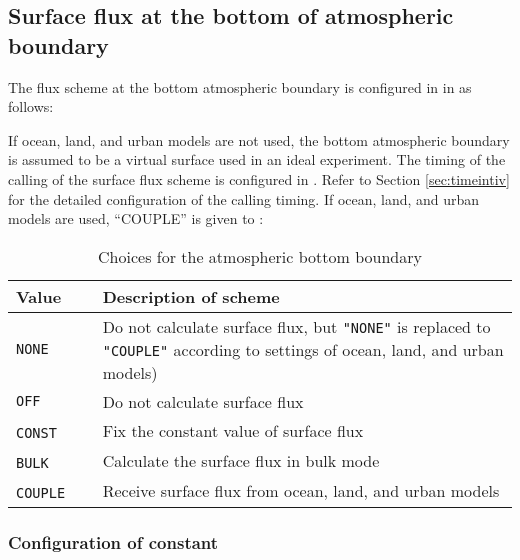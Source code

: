 \subsection{Surface flux at the bottom of atmospheric boundary } \label{subsec:basic_usel_surface}
The flux scheme at the bottom atmospheric boundary is configured in  in  as follows: 

If ocean, land, and urban models are not used, the bottom atmospheric boundary is assumed to be a virtual surface used in an ideal experiment. The timing of the calling of the surface flux scheme is configured in . Refer to Section \ref{sec:timeintiv} for the detailed configuration of the calling timing. If ocean, land, and urban models are used, ``COUPLE'' is given to :

\begin{table}[htb]
\begin{center}
  \caption{Choices for the atmospheric bottom boundary }
  \label{tab:nml_atm_sf}
  \begin{tabularx}{150mm}{lX} \hline
    \rowcolor[gray]{0.9}  Value & Description of scheme\\ \hline
      \verb|NONE|         & Do not calculate surface flux, but \verb|"NONE"| is replaced to \verb|"COUPLE"| according to settings of ocean, land, and urban models) \\
      \verb|OFF|          & Do not calculate surface flux\\
      \verb|CONST|   　　　& Fix the constant value of surface flux \\
      \verb|BULK|    　　　& Calculate the surface flux in bulk mode \\
      \verb|COUPLE|  　　　& Receive surface flux from ocean, land, and urban models \\
    \hline
  \end{tabularx}
\end{center}
\end{table}

\subsubsection{Configuration of constant}

